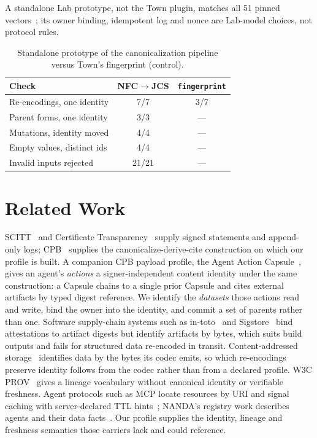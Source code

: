 \documentclass[conference]{IEEEtran}
\begin{document}
A standalone Lab prototype, not the Town plugin, matches all 51 pinned vectors~\cite{artifact}; its owner binding, idempotent log and nonce are Lab-model choices, not protocol rules.

\begin{table}[t]
\caption{Standalone prototype of the canonicalization pipeline versus Town's fingerprint (control).}
\label{tab:proto}
\centering\small
\setlength{\tabcolsep}{4pt}
\begin{tabular}{l|c|c}
\hline
Check & NFC$\rightarrow$JCS & \texttt{fingerprint}\\
\hline
Re-encodings, one identity & 7/7 & 3/7\\
Parent forms, one identity & 3/3 & ---\\
Mutations, identity moved & 4/4 & ---\\
Empty values, distinct ids & 4/4 & ---\\
Invalid inputs rejected & 21/21 & ---\\
\hline
\end{tabular}
\end{table}

\section{Related Work}
SCITT~\cite{rfc9943} and Certificate Transparency~\cite{rfc9162} supply signed statements and append-only logs; CPB~\cite{cpb03} supplies the canonicalize-derive-cite construction on which our profile is built. A companion CPB payload profile, the Agent Action Capsule~\cite{aac}, gives an agent's \emph{actions} a signer-independent content identity under the same construction: a Capsule chains to a single prior Capsule and cites external artifacts by typed digest reference. We identify the \emph{datasets} those actions read and write, bind the owner into the identity, and commit a set of parents rather than one. Software supply-chain systems such as in-toto~\cite{intoto} and Sigstore~\cite{sigstore} bind attestations to artifact digests but identify artifacts by bytes, which suits build outputs and fails for structured data re-encoded in transit. Content-addressed storage~\cite{ipfs} identifies data by the bytes its codec emits, so which re-encodings preserve identity follows from the codec rather than from a declared profile. W3C PROV~\cite{prov} gives a lineage vocabulary without canonical identity or verifiable freshness. Agent protocols such as MCP locate resources by URI and signal caching with server-declared TTL hints~\cite{mcp}; NANDA's registry work describes agents and their data facts~\cite{nanda}. Our profile supplies the identity, lineage and freshness semantics those carriers lack and could reference.
\end{document}
